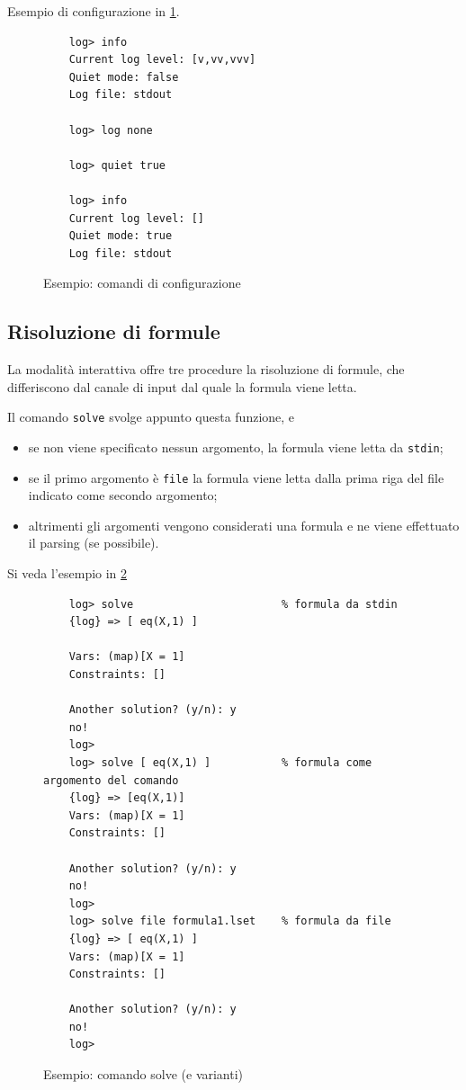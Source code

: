 \documentclass[12pt,a4paper,openright]{book} %
\begin{document}
Esempio di configurazione in \ref{fig:example_confcommands}.

\begin{figure}
	\begin{verbatim}
	log> info
	Current log level: [v,vv,vvv]
	Quiet mode: false
	Log file: stdout

	log> log none

	log> quiet true

	log> info
	Current log level: []
	Quiet mode: true
	Log file: stdout
	\end{verbatim}
	\caption{Esempio: comandi di configurazione}
	\label{fig:example_confcommands}
\end{figure}

\subsection{Risoluzione di formule}

La modalità interattiva offre tre procedure la risoluzione di formule,
che differiscono dal canale di input dal quale la formula viene letta.

Il comando \texttt{solve} svolge appunto questa funzione, e
\begin{itemize}
	\item se non viene specificato nessun argomento, la formula
          viene letta da \texttt{stdin};
	\item se il primo argomento è \texttt{file} la formula viene
          letta dalla prima riga del file indicato come secondo
          argomento;
	\item altrimenti gli argomenti vengono considerati una formula
          e ne viene effettuato il parsing (se possibile).
\end{itemize}

Si veda l'esempio in \ref{fig:example_solvecommands}

\begin{figure}
	\begin{verbatim}
	log> solve                       % formula da stdin
	{log} => [ eq(X,1) ]

	Vars: (map)[X = 1]
	Constraints: []

	Another solution? (y/n): y
	no!
	log>
	log> solve [ eq(X,1) ]           % formula come argomento del comando
	{log} => [eq(X,1)]
	Vars: (map)[X = 1]
	Constraints: []

	Another solution? (y/n): y
	no!
	log>
	log> solve file formula1.lset    % formula da file
	{log} => [ eq(X,1) ]
	Vars: (map)[X = 1]
	Constraints: []

	Another solution? (y/n): y
	no!
	log>
	\end{verbatim}
	\caption{Esempio: comando solve (e varianti)}
	\label{fig:example_solvecommands}
\end{figure}
\end{document}
